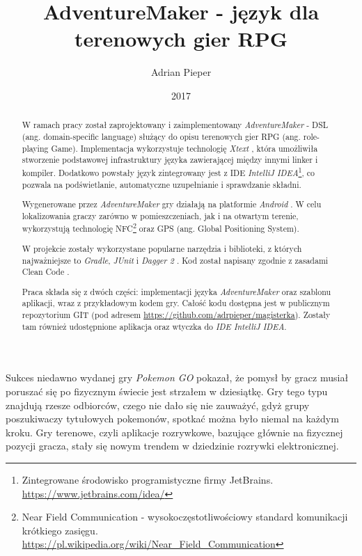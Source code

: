 \documentclass[openright]{xmgr}
\author   {Adrian Pieper}
\title    {AdventureMaker - język dla terenowych gier RPG}
\date     {2017}
\begin{document}
\begin{abstract}
  W ramach pracy został zaprojektowany i zaimplementowany \textit{AdventureMaker} - DSL (ang. domain-specific language) służący do opisu terenowych gier RPG (ang. role-playing Game). Implementacja wykorzystuje technologię \textit{Xtext} \cite{Xtext:2017:Doc}, która umożliwiła stworzenie podstawowej infrastruktury języka zawierającej między innymi linker i kompiler. Dodatkowo powstały język zintegrowany jest z IDE \textit{IntelliJ IDEA}\footnote{Zintegrowane środowisko programistyczne firmy JetBrains. \url{https://www.jetbrains.com/idea/}}, co pozwala na podświetlanie, automatyczne uzupełnianie i sprawdzanie składni.
  
  Wygenerowane przez \textit{AdventureMaker} gry działają na platformie \textit{Android} \cite{AndroidSDK:2017:Doc}. W celu lokalizowania graczy zarówno w pomieszczeniach, jak i na otwartym terenie, wykorzystują technologię NFC\footnote{Near Field Communication - wysokoczęstotliwościowy standard komunikacji krótkiego zasięgu. \url{https://pl.wikipedia.org/wiki/Near_Field_Communication}} oraz GPS (ang. Global Positioning System).
  
  W projekcie zostały wykorzystane popularne narzędzia i biblioteki, z których najważniejsze to \textit{Gradle}\cite{Gradle:2017:Doc}, \textit{JUnit}\cite{JUnit:2017:Doc} i \textit{Dagger 2} \cite{Dagger2:2017:Doc}. Kod został napisany zgodnie z zasadami Clean Code \cite{CleanCode:2005}.
  
  Praca składa się z dwóch części: implementacji języka \textit{AdventureMaker} oraz szablonu aplikacji, wraz z przykładowym kodem gry. Całość kodu dostępna jest w publicznym repozytorium GIT (pod adresem \url{https://github.com/adrpieper/magisterka}). Zostały tam również udostępnione aplikacja oraz wtyczka do \textit{IDE IntelliJ IDEA}.
\end{abstract}


\maketitle

\introduction

Sukces niedawno wydanej gry \textit{Pokemon GO} pokazał, że pomysł by gracz musiał poruszać się po fizycznym świecie jest strzałem w dziesiątkę. Gry tego typu znajdują rzesze odbiorców, czego nie dało się nie zauważyć, gdyż grupy poszukiwaczy tytułowych pokemonów, spotkać można było niemal na każdym kroku. Gry terenowe, czyli aplikacje rozrywkowe, bazujące głównie na fizycznej pozycji gracza, stały się nowym trendem w dziedzinie rozrywki elektronicznej.
\end{document}
